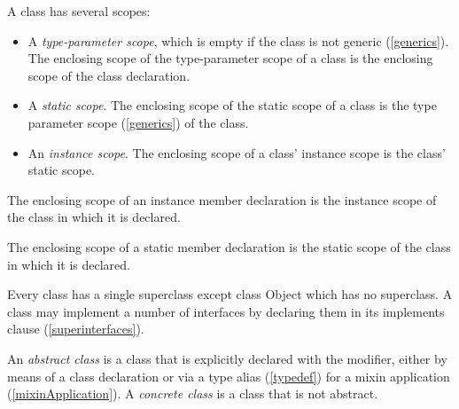 \documentclass{article}
\newcommand{\code}[1]{{\sf #1}}
\begin{document}
A class has several scopes:
\begin{itemize}
\item A {\em type-parameter scope}, which is empty if the class is not generic (\ref{generics}).  The enclosing scope of the type-parameter scope of a class is the enclosing scope of the class declaration. 
\item A {\em static scope}. The enclosing scope of the static scope of a  class is the type parameter scope (\ref{generics}) of the class.
\item  An {\em instance scope}.
The enclosing scope of a class' instance scope is the class' static scope.
\end{itemize}

The enclosing scope of an instance member declaration is the instance scope of the class in which it is declared.

The enclosing scope of a static member declaration is the static scope of the class in which it is declared.


\LMHash{}
Every class has a single superclass  except class \code{Object} which has no superclass. A class may implement a number of interfaces
by declaring them in its implements clause  (\ref{superinterfaces}).


\LMHash{}
An {\em abstract class} is 
a class that is explicitly declared with the  \ABSTRACT{}  modifier, either by means of a class declaration or via a type alias (\ref{typedef}) for a mixin application (\ref{mixinApplication}). A {\em concrete class} is a class that is not abstract.

\end{document}
